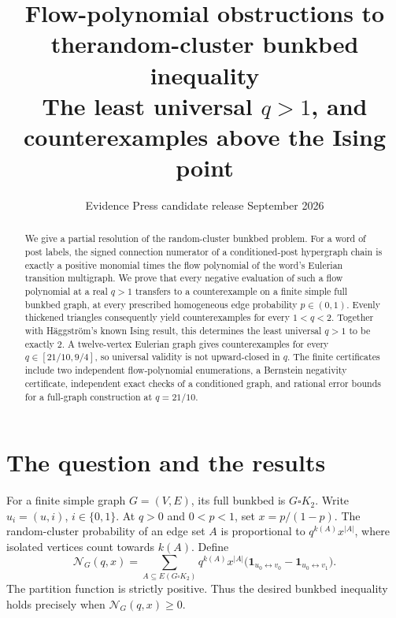 \documentclass[11pt,a4paper]{article}
\title{\vspace{-10mm}\textbf{Flow-polynomial obstructions to the\newline random-cluster bunkbed inequality}\\[3mm]
\large The least universal $q>1$, and counterexamples above the Ising point}
\author{}\date{Evidence Press candidate release\enspace\textbullet\enspace 30 September 2026}
\theoremstyle{remark}\newtheorem{remark}[theorem]{Remark}
\newcommand{\one}{\mathbf 1}\newcommand{\N}{\mathcal N}
\newcommand{\bb}{\square K_2}
\begin{document}
\maketitle\vspace{-7mm}
\begin{abstract}
We give a partial resolution of the random-cluster bunkbed problem. For a word of post labels, the signed connection numerator of a conditioned-post hypergraph chain is exactly a positive monomial times the flow polynomial of the word's Eulerian transition multigraph. We prove that every negative evaluation of such a flow polynomial at a real $q>1$ transfers to a counterexample on a finite simple full bunkbed graph, at every prescribed homogeneous edge probability $p\in(0,1)$. Evenly thickened triangles consequently yield counterexamples for every $1<q<2$. Together with H\"aggstr\"om's known Ising result, this determines the least universal $q>1$ to be exactly $2$. A twelve-vertex Eulerian graph gives counterexamples for every $q\in[21/10,9/4]$, so universal validity is not upward-closed in $q$. The finite certificates include two independent flow-polynomial enumerations, a Bernstein negativity certificate, independent exact checks of a conditioned graph, and rational error bounds for a full-graph construction at $q=21/10$.
\end{abstract}
\vspace{1mm}
\noindent{}

\section{The question and the results}
For a finite simple graph $G=(V,E)$, its full bunkbed is $G\bb$. Write $u_i=(u,i)$, $i\in\{0,1\}$. At $q>0$ and $0<p<1$, set $x=p/(1-p)$. The random-cluster probability of an edge set $A$ is proportional to $q^{k(A)}x^{|A|}$, where isolated vertices count towards $k(A)$. Define
\begin{equation}\label{eq:signed}
\N_G(q,x)=\sum_{A\subseteq E(G\bb)}q^{k(A)}x^{|A|}
\big(\one_{u_0\leftrightarrow v_0}-\one_{u_0\leftrightarrow v_1}\big).
\end{equation}
The partition function is strictly positive. Thus the desired bunkbed inequality holds precisely when $\N_G(q,x)\ge0$.
\end{document}
